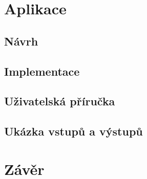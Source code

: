 \chapter{Aplikace}

\section{Návrh}

\section{Implementace}

\section{Uživatelská příručka}

\section{Ukázka vstupů a výstupů}


\chapter{Závěr}



